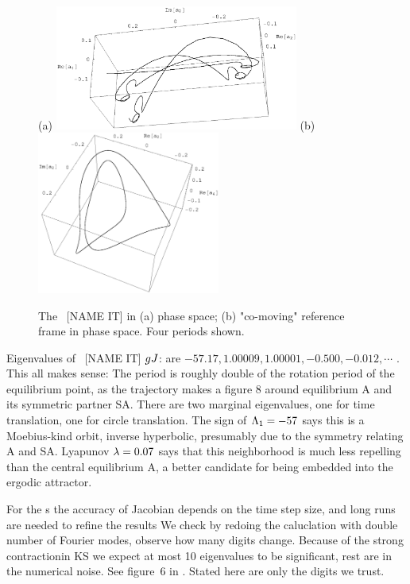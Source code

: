 \begin{figure}[t] %
\centering
(a) \includegraphics[width=8.0cm]{figs/rpo22-55-4.eps}
\hspace{0.1in}
(b) \includegraphics[width=6.0cm]{figs/rpo22-55-4-cm.eps}
\caption{
 The \rpo\ [NAME IT] in (a) phase space;
 (b) "co-moving" reference frame in phase space. Four periods shown.
        }
\label{f:rpoNAMEIT}
\end{figure}


Eigenvalues of \rpo\ [NAME IT] $g{J}$: are
$ -57.17,  1.00009, 1.00001, -0.500, -0.012, \cdots$ .
This all makes sense: The period is roughly double of the rotation period of
the equilibrium point, as the trajectory makes a figure 8 around equilibrium A and
its symmetric partner SA.
 There are two
marginal eigenvalues, one for time translation, one for
circle translation. 
The sign of $\Lambda_{1}=-57$ says this is a Moebius-kind orbit,
inverse hyperbolic, presumably due to the symmetry relating A and SA.
Lyapunov $\lambda=0.07$ says that this neighborhood is much less repelling than
the central equilibrium A, a better candidate for being embedded into the
ergodic attractor.

For the \rpo s the accuracy of Jacobian depends
on the time step size, and long runs are needed to refine the results
We check by redoing the caluclation with double 
number of Fourier modes, observe how many digits
change. 
Because of the strong contractionin KS we expect at most 10 eigenvalues to be
significant, rest are in the numerical noise. See figure~6 in
.
Stated here are only the digits we trust.


